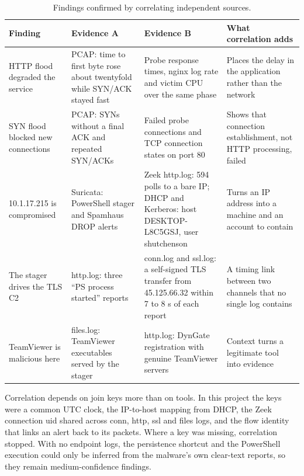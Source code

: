 \begin{table}[htbp]
  \centering
  \caption{Findings confirmed by correlating independent sources.}
  \label{tab:correlation}
  \scriptsize
  \setlength{\tabcolsep}{3pt}
  \begin{tabularx}{\linewidth}{@{}YYYY@{}}
    \toprule
    \textbf{Finding} & \textbf{Evidence A} & \textbf{Evidence B} & \textbf{What correlation adds} \\
    \midrule
    HTTP flood degraded the service
      & PCAP: time to first byte rose about twentyfold while SYN/ACK stayed fast
      & Probe response times, nginx log rate and victim CPU over the same phase
      & Places the delay in the application rather than the network \\
    SYN flood blocked new connections
      & PCAP: SYNs without a final ACK and repeated SYN/ACKs
      & Failed probe connections and TCP connection states on port 80
      & Shows that connection establishment, not HTTP processing, failed \\
    10.1.17.215 is compromised
      & Suricata: PowerShell stager and Spamhaus DROP alerts
      & Zeek http.log: 594 polls to a bare IP; DHCP and Kerberos: host DESKTOP-L8C5GSJ, user shutchenson
      & Turns an IP address into a machine and an account to contain \\
    The stager drives the TLS C2
      & http.log: three ``PS process started'' reports
      & conn.log and ssl.log: a self-signed TLS transfer from 45.125.66.32 within 7 to 8 s of each report
      & A timing link between two channels that no single log contains \\
    TeamViewer is malicious here
      & files.log: TeamViewer executables served by the stager
      & http.log: DynGate registration with genuine TeamViewer servers
      & Context turns a legitimate tool into evidence \\
    \bottomrule
  \end{tabularx}
\end{table}

Correlation depends on join keys more than on tools. In this project the keys were a common UTC clock, the IP-to-host mapping from DHCP, the Zeek connection uid shared across conn, http, ssl and files logs, and the flow identity that links an alert back to its packets. Where a key was missing, correlation stopped. With no endpoint logs, the persistence shortcut and the PowerShell execution could only be inferred from the malware's own clear-text reports, so they remain medium-confidence findings.

